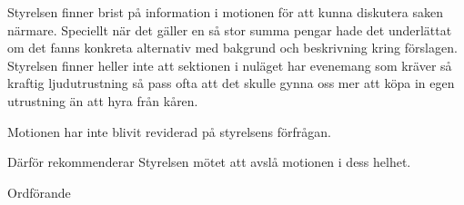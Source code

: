 \documentclass[../_main/handlingar.tex]{subfiles}
\begin{document}
\motionssvar
Styrelsen finner brist på information i motionen för att kunna diskutera saken närmare. Speciellt när det gäller en så stor summa pengar hade det underlättat om det fanns konkreta alternativ
med bakgrund och beskrivning kring förslagen. Styrelsen finner heller inte att sektionen i nuläget har evenemang som kräver så kraftig ljudutrustning så pass ofta att det skulle 
gynna oss mer att köpa in egen utrustning än att hyra från kåren.

Motionen har inte blivit reviderad på styrelsens förfrågan.

Därför rekommenderar Styrelsen mötet att avslå motionen i dess helhet.

\begin{signatures}{1}
    \ist
    \signature{\ordf}{Ordförande}
\end{signatures}
\end{document}
